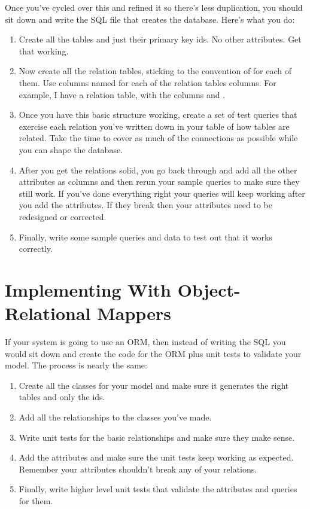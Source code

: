 Once you've cycled over this and refined it so there's less duplication, you should sit
down and write the SQL file that creates the database.  Here's what you do:

\begin{enumerate}
\item Create all the tables and just their primary key ids.  No other attributes.  Get that
    working.
\item Now create all the relation tables, sticking to the convention of 
    for each of them.  Use columns named  for each of the relation tables
    columns.  For example, I have a  relation table, with the columns
     and .
\item Once you have this basic structure working, create a set of test queries that exercise
    each relation you've written down in your table of how tables are related.  Take the time
    to cover as much of the connections as possible while you can shape the database.
\item After you get the relations solid, you go back through and add all the other attributes
    as columns and then rerun your sample queries to make sure they still work.  If you've
    done everything right your queries will keep working after you add the attributes.  If they
    break then your attributes need to be redesigned or corrected.
\item Finally, write some sample queries and data to test out that it works correctly.
\end{enumerate}


\section{Implementing With Object-Relational Mappers}

If your system is going to use an ORM, then instead of writing the SQL you would sit down and
create the code for the ORM plus unit tests to validate your model.  The process is nearly
the same:

\begin{enumerate}
\item Create all the classes for your model and make sure it generates the right tables and
    only the ids.
\item Add all the relationships to the classes you've made.
\item Write unit tests for the basic relationships and make sure they make sense.
\item Add the attributes and make sure the unit tests keep working as expected.  Remember your attributes
    shouldn't break any of your relations.
\item Finally, write higher level unit tests that validate the attributes and queries for them.
\end{enumerate}

